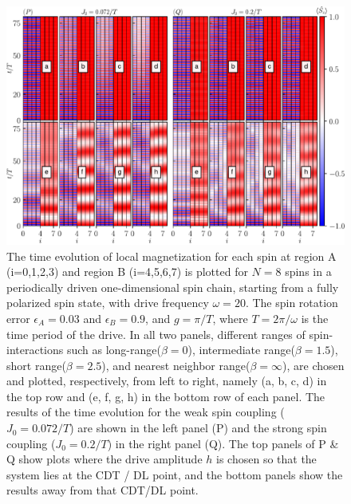 \documentclass[12pt]{iopart}
\begin{document}
\begin{figure}[t!]
    \centering
    \hspace{2cm}\includegraphics[width=13.5cm]{figure4.pdf}
    \caption{The time evolution of local magnetization for each spin at region A (i=0,1,2,3) and region B (i=4,5,6,7) is plotted for $N=8$ spins in a periodically driven one-dimensional spin chain, starting from a fully polarized spin state, with drive frequency $\omega=20$. The spin rotation error $\epsilon_A = 0.03$ and $\epsilon_B = 0.9$, and $g=\pi/T$, where $T=2\pi/\omega$ is the time period of the drive.  In all two panels, different ranges of spin-interactions such as long-range($\beta=0$), intermediate range($\beta=1.5$), short range($\beta=2.5$), and nearest neighbor range($\beta=\infty$), are chosen and plotted, respectively, from left to right, namely (a, b, c, d) in the top row and (e, f, g, h) in the bottom row of each panel. The results of the time evolution for the weak spin coupling ($J_0 = 0.072/T$) are shown in the left panel (P) and the strong spin coupling ($J_0 = 0.2/T$) in the right panel (Q). The top panels of P \& Q show plots where the drive amplitude $h$ is chosen so that the system lies at the CDT / DL point, and the bottom panels show the results away from that CDT/DL point.}
    \label{Fig:strong_weak_ea}
\end{figure}
\end{document}
